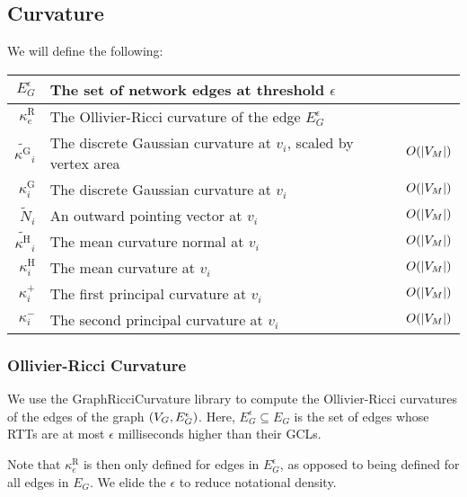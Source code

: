 
\subsection{Curvature}
We will define the following: \begin{center}\begin{tabular}{r|l|l}
	\(E_G^\epsilon\) & The set of network edges at threshold \(\epsilon\) & \\ \hline
	\(\kappa^\text{R}_e\) & The Ollivier-Ricci curvature of the edge \(E_G^\epsilon\) & \\ \hline
	\(\widetilde{\kappa^\text{G}}_i\) & The discrete Gaussian curvature at \(v_i\), scaled by vertex area & \(O\pof{\abs{V_M}}\) \\ \hline
	\(\kappa^\text{G}_i\) & The discrete Gaussian curvature at \(v_i\) & \(O\pof{\abs{V_M}}\) \\ \hline
	\(\widetilde{N}_i\) & An outward pointing vector at \(v_i\) & \(O\pof{\abs{V_M}}\) \\ \hline
	\(\widetilde{\kappa^\text{H}}_i\) & The mean curvature normal at \(v_i\) & \(O\pof{\abs{V_M}}\) \\ \hline
	\(\kappa^\text{H}_i\) & The mean curvature at \(v_i\) & \(O\pof{\abs{V_M}}\) \\ \hline
	\(\kappa^+_i\) & The first principal curvature at \(v_i\) & \(O\pof{\abs{V_M}}\) \\ \hline
	\(\kappa^-_i\) & The second principal curvature at \(v_i\) & \(O\pof{\abs{V_M}}\)
\end{tabular}\end{center}

\subsubsection{Ollivier-Ricci Curvature}
We use the GraphRicciCurvature library \cite{ni2019community} to compute the Ollivier-Ricci curvatures of the edges of the graph \(\pof{V_G, E_G^\epsilon}\). Here, \(E_G^\epsilon \subseteq E_G\) is the set of edges whose RTTs are at most \(\epsilon\) milliseconds higher than their GCLs.

Note that \(\kappa^\text{R}_e\) is then only defined for edges in \(E_G^\epsilon\), as opposed to being defined for all edges in \(E_G\). We elide the \(\epsilon\) to reduce notational density.

